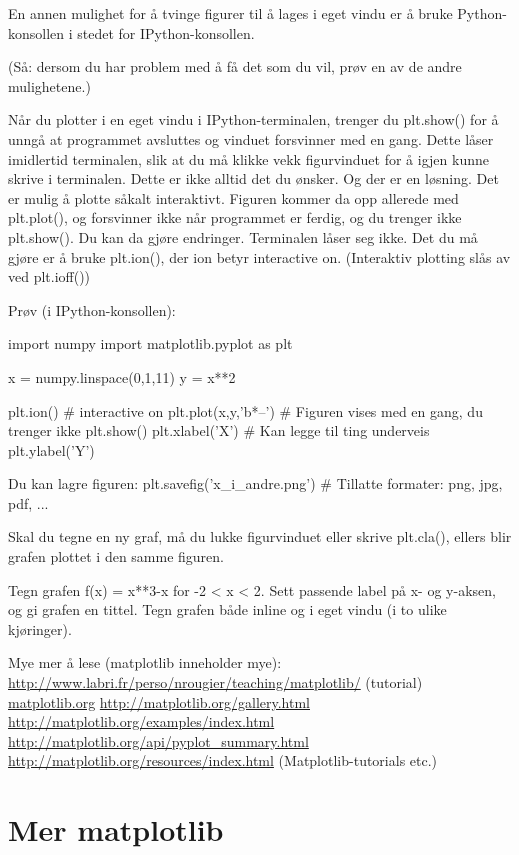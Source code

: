 En annen mulighet for å tvinge figurer til å lages i eget vindu er å bruke Python-konsollen i stedet for IPython-konsollen. 

(Så: dersom du har problem med å få det som du vil, prøv en av de andre mulighetene.) 

Når du plotter i en eget vindu i IPython-terminalen, trenger du plt.show() for å unngå at programmet avsluttes og vinduet forsvinner med en gang. Dette låser imidlertid terminalen, slik at du må klikke vekk figurvinduet for å igjen kunne skrive i terminalen. Dette er ikke alltid det du ønsker. Og der er en løsning. Det er mulig å plotte såkalt interaktivt. Figuren kommer da opp allerede med plt.plot(), og forsvinner ikke når programmet er ferdig, og du trenger ikke plt.show(). Du kan da gjøre endringer. Terminalen låser seg ikke. Det du må gjøre er å bruke plt.ion(), der ion betyr interactive on. (Interaktiv plotting slås av ved plt.ioff()) 

Prøv (i IPython-konsollen):
\begin{usncodebox}
import numpy 
import matplotlib.pyplot as plt 

x = numpy.linspace(0,1,11)
y = x**2

plt.ion()              # interactive on 
plt.plot(x,y,'b*--')   # Figuren vises med en gang, du trenger ikke plt.show()
plt.xlabel('X')        # Kan legge til ting underveis
plt.ylabel('Y') 

Du kan lagre figuren: 
plt.savefig('x_i_andre.png')   # Tillatte formater: png, jpg, pdf, ... 
\end{usncodebox}

Skal du tegne en ny graf, må du lukke figurvinduet eller skrive plt.cla(), ellers blir grafen plottet i den samme figuren. 

\begin{exercise}
Tegn grafen f(x) = x**3-x for -2 < x < 2. Sett passende label på x- og y-aksen, og gi grafen en tittel. Tegn grafen både inline og i eget vindu (i to ulike kjøringer). 
\end{exercise}

Mye mer å lese (matplotlib inneholder mye): 
\url{http://www.labri.fr/perso/nrougier/teaching/matplotlib/}  (tutorial) 
\url{matplotlib.org}
\url{http://matplotlib.org/gallery.html} 
\url{http://matplotlib.org/examples/index.html}
\url{http://matplotlib.org/api/pyplot_summary.html}
\url{http://matplotlib.org/resources/index.html}  (Matplotlib-tutorials etc.)

\section{Mer matplotlib}

